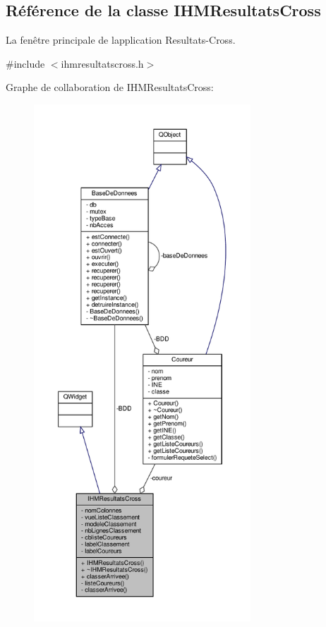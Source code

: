 \hypertarget{class_i_h_m_resultats_cross}{}\subsection{Référence de la classe I\+H\+M\+Resultats\+Cross}
\label{class_i_h_m_resultats_cross}


La fenêtre principale de l\textquotesingle{}application Resultats-\/\+Cross.  




{\ttfamily \#include $<$ihmresultatscross.\+h$>$}



Graphe de collaboration de I\+H\+M\+Resultats\+Cross\+:\nopagebreak
\begin{figure}[H]
\begin{center}
\leavevmode
\includegraphics[height=550pt]{class_i_h_m_resultats_cross__coll__graph}
\end{center}
\end{figure}
